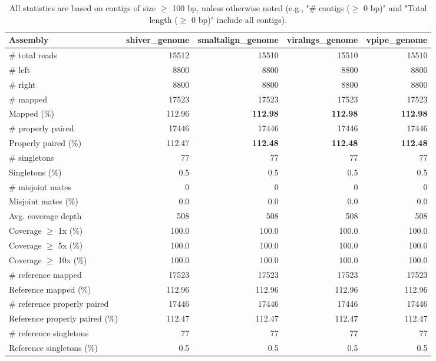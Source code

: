 \documentclass[12pt,a4paper]{article}
\begin{document}
\begin{table}[ht]
\begin{center}
\caption{All statistics are based on contigs of size $\geq$ 100 bp, unless otherwise noted (e.g., "\# contigs ($\geq$ 0 bp)" and "Total length ($\geq$ 0 bp)" include all contigs).}
\begin{tabular}{|l*{4}{|r}|}
\hline
Assembly & shiver\_genome & smaltalign\_genome & viralngs\_genome & vpipe\_genome \\ \hline
\# total reads & 15512 & 15510 & 15510 & 15510 \\ \hline
\# left & 8800 & 8800 & 8800 & 8800 \\ \hline
\# right & 8800 & 8800 & 8800 & 8800 \\ \hline
\# mapped & 17523 & 17523 & 17523 & 17523 \\ \hline
Mapped (\%) & 112.96 & {\bf 112.98} & {\bf 112.98} & {\bf 112.98} \\ \hline
\# properly paired & 17446 & 17446 & 17446 & 17446 \\ \hline
Properly paired (\%) & 112.47 & {\bf 112.48} & {\bf 112.48} & {\bf 112.48} \\ \hline
\# singletons & 77 & 77 & 77 & 77 \\ \hline
Singletons (\%) & 0.5 & 0.5 & 0.5 & 0.5 \\ \hline
\# misjoint mates & 0 & 0 & 0 & 0 \\ \hline
Misjoint mates (\%) & 0.0 & 0.0 & 0.0 & 0.0 \\ \hline
Avg. coverage depth & 508 & 508 & 508 & 508 \\ \hline
Coverage $\geq$ 1x (\%) & 100.0 & 100.0 & 100.0 & 100.0 \\ \hline
Coverage $\geq$ 5x (\%) & 100.0 & 100.0 & 100.0 & 100.0 \\ \hline
Coverage $\geq$ 10x (\%) & 100.0 & 100.0 & 100.0 & 100.0 \\ \hline
\# reference mapped & 17523 & 17523 & 17523 & 17523 \\ \hline
Reference mapped (\%) & 112.96 & 112.96 & 112.96 & 112.96 \\ \hline
\# reference properly paired & 17446 & 17446 & 17446 & 17446 \\ \hline
Reference properly paired (\%) & 112.47 & 112.47 & 112.47 & 112.47 \\ \hline
\# reference singletons & 77 & 77 & 77 & 77 \\ \hline
Reference singletons (\%) & 0.5 & 0.5 & 0.5 & 0.5 \\ \hline

\end{tabular}
\end{center}
\end{table}
\end{document}

